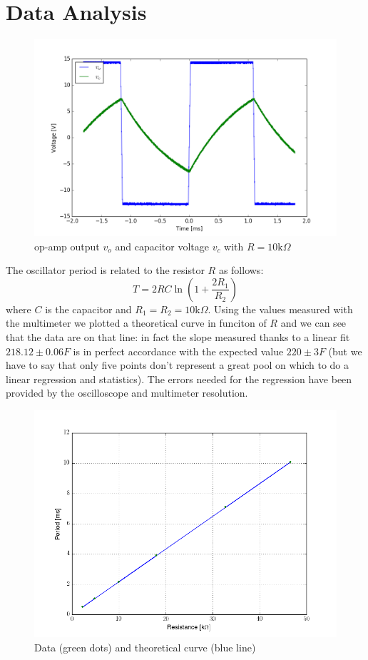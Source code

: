 \section{Data Analysis}
\begin{figure}[H]
\centering
\includegraphics[width=.7\textwidth]{5/10k_plot.png}
\caption{op-amp output $v_o$ and capacitor voltage $v_c$ with $R=10\text{k}\Omega$}
\end{figure}
The oscillator period is related to the resistor $R$ as follows:
\[T = 2RC\ln \left(1+\frac{2R_1}{R_2}\right)\]
where $C$ is the capacitor and $R_1=R_2=10\text{k}\Omega$. Using the values measured with the multimeter we plotted a theoretical curve in funciton of $R$ and we can see that the data are on that line: in fact the slope measured thanks to a linear fit $218.12 \pm 0.06 F$ is in perfect accordance with the expected value $220 \pm 3 F$ (but we have to say that only five points don't represent a great pool on which to do a linear regression and statistics). The errors needed for the regression have been provided by the oscilloscope and multimeter resolution. 
\begin{figure}[H]
\centering
\includegraphics[width=.7\textwidth]{5/fit.png}
\caption{Data (green dots) and theoretical curve (blue line)}
\end{figure}
